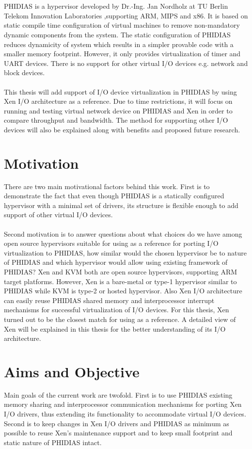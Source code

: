 \\
\\
PHIDIAS is a hypervisor developed by Dr.-Ing. Jan Nordholz at TU Berlin Telekom Innovation Laboratories \cite{Jan},supporting ARM, MIPS and x86. It is based on static compile time configuration of virtual machines to remove non-mandatory dynamic components from the system. The static configuration of PHIDIAS reduces dynamicity of system which results in a simpler provable code with a smaller memory footprint. However, it only provides virtualization of timer and UART devices. There is no support for other virtual I/O devices e.g. network and block devices.
\\
\\
This thesis will add support of I/O device virtualization in PHIDIAS by using Xen I/O architecture as a reference. Due to time restrictions, it will focus on running and testing virtual network device on PHIDIAS  and Xen in order to compare throughput and bandwidth. The method for supporting other I/O devices will also be explained along with benefits and proposed future research.

\section{Motivation\label{sec:moti}}
There are two main motivational factors behind this work. First is to demonstrate the fact that even though PHIDIAS is a statically configured hypervisor with a minimal set of drivers, its structure is flexible enough to add support of other virtual I/O devices. \\
\\
Second motivation is to answer questions about what choices do we have among open source hypervisors suitable for using as a reference for porting I/O virtualization to PHIDIAS, how similar would the chosen hypervisor be to nature of PHIDIAS and which hypervisor would allow using existing framework of PHIDIAS? Xen and KVM both are open source hypervisors, supporting ARM target platforms. However, Xen is a bare-metal or type-1 hypervisor similar to PHIDIAS while KVM is type-2 or hosted hypervisor. Also Xen I/O architecture can easily reuse PHIDIAS shared memory and interprocessor interrupt mechanisms for successful virtualization of I/O devices. For this thesis, Xen turned out to be the closest match for using as a reference. A detailed view of Xen will be explained in this thesis for the better understanding of its I/O architecture.

\section{Aims and Objective\label{sec:objective}}
Main goals of the current work are twofold. First is to use PHIDIAS existing memory sharing and interprocessor communication mechanisms for porting Xen I/O drivers, thus extending its functionality to accommodate virtual I/O devices. Second is to keep changes in Xen I/O drivers and PHIDIAS as minimum as possible to reuse Xen's maintenance support and to keep small footprint and static nature of PHIDIAS intact.

